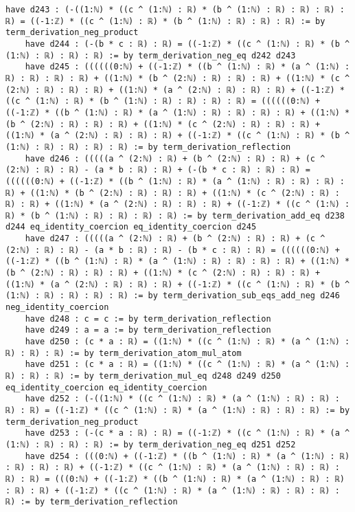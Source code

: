 \documentclass{article}
\begin{document}
\begin{tcolorbox}[colback=white!10, width=\linewidth]
\begin{lstlisting}[language=Lean4]
    have d243 : (-((1:ℕ) * ((c ^ (1:ℕ) : ℝ) * (b ^ (1:ℕ) : ℝ) : ℝ) : ℝ) : ℝ) = ((-1:ℤ) * ((c ^ (1:ℕ) : ℝ) * (b ^ (1:ℕ) : ℝ) : ℝ) : ℝ) := by term_derivation_neg_product
    have d244 : (-(b * c : ℝ) : ℝ) = ((-1:ℤ) * ((c ^ (1:ℕ) : ℝ) * (b ^ (1:ℕ) : ℝ) : ℝ) : ℝ) := by term_derivation_neg_eq d242 d243
    have d245 : ((((((0:ℕ) + ((-1:ℤ) * ((b ^ (1:ℕ) : ℝ) * (a ^ (1:ℕ) : ℝ) : ℝ) : ℝ) : ℝ) + ((1:ℕ) * (b ^ (2:ℕ) : ℝ) : ℝ) : ℝ) + ((1:ℕ) * (c ^ (2:ℕ) : ℝ) : ℝ) : ℝ) + ((1:ℕ) * (a ^ (2:ℕ) : ℝ) : ℝ) : ℝ) + ((-1:ℤ) * ((c ^ (1:ℕ) : ℝ) * (b ^ (1:ℕ) : ℝ) : ℝ) : ℝ) : ℝ) = ((((((0:ℕ) + ((-1:ℤ) * ((b ^ (1:ℕ) : ℝ) * (a ^ (1:ℕ) : ℝ) : ℝ) : ℝ) : ℝ) + ((1:ℕ) * (b ^ (2:ℕ) : ℝ) : ℝ) : ℝ) + ((1:ℕ) * (c ^ (2:ℕ) : ℝ) : ℝ) : ℝ) + ((1:ℕ) * (a ^ (2:ℕ) : ℝ) : ℝ) : ℝ) + ((-1:ℤ) * ((c ^ (1:ℕ) : ℝ) * (b ^ (1:ℕ) : ℝ) : ℝ) : ℝ) : ℝ) := by term_derivation_reflection
    have d246 : (((((a ^ (2:ℕ) : ℝ) + (b ^ (2:ℕ) : ℝ) : ℝ) + (c ^ (2:ℕ) : ℝ) : ℝ) - (a * b : ℝ) : ℝ) + (-(b * c : ℝ) : ℝ) : ℝ) = ((((((0:ℕ) + ((-1:ℤ) * ((b ^ (1:ℕ) : ℝ) * (a ^ (1:ℕ) : ℝ) : ℝ) : ℝ) : ℝ) + ((1:ℕ) * (b ^ (2:ℕ) : ℝ) : ℝ) : ℝ) + ((1:ℕ) * (c ^ (2:ℕ) : ℝ) : ℝ) : ℝ) + ((1:ℕ) * (a ^ (2:ℕ) : ℝ) : ℝ) : ℝ) + ((-1:ℤ) * ((c ^ (1:ℕ) : ℝ) * (b ^ (1:ℕ) : ℝ) : ℝ) : ℝ) : ℝ) := by term_derivation_add_eq d238 d244 eq_identity_coercion eq_identity_coercion d245
    have d247 : (((((a ^ (2:ℕ) : ℝ) + (b ^ (2:ℕ) : ℝ) : ℝ) + (c ^ (2:ℕ) : ℝ) : ℝ) - (a * b : ℝ) : ℝ) - (b * c : ℝ) : ℝ) = ((((((0:ℕ) + ((-1:ℤ) * ((b ^ (1:ℕ) : ℝ) * (a ^ (1:ℕ) : ℝ) : ℝ) : ℝ) : ℝ) + ((1:ℕ) * (b ^ (2:ℕ) : ℝ) : ℝ) : ℝ) + ((1:ℕ) * (c ^ (2:ℕ) : ℝ) : ℝ) : ℝ) + ((1:ℕ) * (a ^ (2:ℕ) : ℝ) : ℝ) : ℝ) + ((-1:ℤ) * ((c ^ (1:ℕ) : ℝ) * (b ^ (1:ℕ) : ℝ) : ℝ) : ℝ) : ℝ) := by term_derivation_sub_eqs_add_neg d246 neg_identity_coercion
    have d248 : c = c := by term_derivation_reflection
    have d249 : a = a := by term_derivation_reflection
    have d250 : (c * a : ℝ) = ((1:ℕ) * ((c ^ (1:ℕ) : ℝ) * (a ^ (1:ℕ) : ℝ) : ℝ) : ℝ) := by term_derivation_atom_mul_atom
    have d251 : (c * a : ℝ) = ((1:ℕ) * ((c ^ (1:ℕ) : ℝ) * (a ^ (1:ℕ) : ℝ) : ℝ) : ℝ) := by term_derivation_mul_eq d248 d249 d250 eq_identity_coercion eq_identity_coercion
    have d252 : (-((1:ℕ) * ((c ^ (1:ℕ) : ℝ) * (a ^ (1:ℕ) : ℝ) : ℝ) : ℝ) : ℝ) = ((-1:ℤ) * ((c ^ (1:ℕ) : ℝ) * (a ^ (1:ℕ) : ℝ) : ℝ) : ℝ) := by term_derivation_neg_product
    have d253 : (-(c * a : ℝ) : ℝ) = ((-1:ℤ) * ((c ^ (1:ℕ) : ℝ) * (a ^ (1:ℕ) : ℝ) : ℝ) : ℝ) := by term_derivation_neg_eq d251 d252
    have d254 : (((0:ℕ) + ((-1:ℤ) * ((b ^ (1:ℕ) : ℝ) * (a ^ (1:ℕ) : ℝ) : ℝ) : ℝ) : ℝ) + ((-1:ℤ) * ((c ^ (1:ℕ) : ℝ) * (a ^ (1:ℕ) : ℝ) : ℝ) : ℝ) : ℝ) = (((0:ℕ) + ((-1:ℤ) * ((b ^ (1:ℕ) : ℝ) * (a ^ (1:ℕ) : ℝ) : ℝ) : ℝ) : ℝ) + ((-1:ℤ) * ((c ^ (1:ℕ) : ℝ) * (a ^ (1:ℕ) : ℝ) : ℝ) : ℝ) : ℝ) := by term_derivation_reflection

\end{lstlisting}
\end{tcolorbox}
\end{document}
